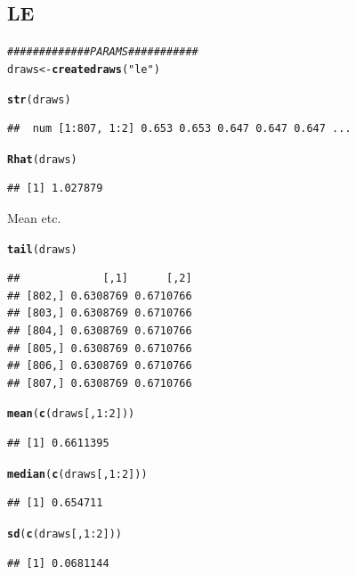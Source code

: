 \documentclass{article}\usepackage[]{graphicx}\usepackage[]{color}
\makeatletter
\newcommand{\hlnum}[1]{\textcolor[rgb]{0.686,0.059,0.569}{#1}}%
\newcommand{\hlstr}[1]{\textcolor[rgb]{0.192,0.494,0.8}{#1}}%
\newcommand{\hlcom}[1]{\textcolor[rgb]{0.678,0.584,0.686}{\textit{#1}}}%
\newcommand{\hlopt}[1]{\textcolor[rgb]{0,0,0}{#1}}%
\newcommand{\hlstd}[1]{\textcolor[rgb]{0.345,0.345,0.345}{#1}}%
\newcommand{\hlkwb}[1]{\textcolor[rgb]{0.69,0.353,0.396}{#1}}%
\newcommand{\hlkwd}[1]{\textcolor[rgb]{0.737,0.353,0.396}{\textbf{#1}}}%
\newenvironment{kframe}{%
 \def\at@end@of@kframe{}%
 \ifinner\ifhmode%
  \def\at@end@of@kframe{\end{minipage}}%
  \begin{minipage}{\columnwidth}%
 \fi\fi%
 \def\FrameCommand##1{\hskip\@totalleftmargin \hskip-\fboxsep
 \colorbox{shadecolor}{##1}\hskip-\fboxsep
     \hskip-\linewidth \hskip-\@totalleftmargin \hskip\columnwidth}%
 \MakeFramed {\advance\hsize-\width
   \@totalleftmargin\z@ \linewidth\hsize
   \@setminipage}}%
 {\par\unskip\endMakeFramed%
 \at@end@of@kframe}
\newenvironment{knitrout}{}{} %
\makeatother
\begin{document}
\subsection{LE}

\begin{knitrout}
\color{fgcolor}\begin{kframe}
\begin{alltt}
\hlcom{############# PARAMS###########}
\hlstd{draws} \hlkwb{<-} \hlkwd{createdraws}\hlstd{(}\hlstr{"le"}\hlstd{)}

\hlkwd{str}\hlstd{(draws)}
\end{alltt}
\begin{verbatim}
##  num [1:807, 1:2] 0.653 0.653 0.647 0.647 0.647 ...
\end{verbatim}
\begin{alltt}
\hlkwd{Rhat}\hlstd{(draws)}
\end{alltt}
\begin{verbatim}
## [1] 1.027879
\end{verbatim}
\end{kframe}
\end{knitrout}

Mean etc.

\begin{knitrout}
\color{fgcolor}\begin{kframe}
\begin{alltt}
\hlkwd{tail}\hlstd{(draws)}
\end{alltt}
\begin{verbatim}
##             [,1]      [,2]
## [802,] 0.6308769 0.6710766
## [803,] 0.6308769 0.6710766
## [804,] 0.6308769 0.6710766
## [805,] 0.6308769 0.6710766
## [806,] 0.6308769 0.6710766
## [807,] 0.6308769 0.6710766
\end{verbatim}
\begin{alltt}
\hlkwd{mean}\hlstd{(}\hlkwd{c}\hlstd{(draws[,} \hlnum{1}\hlopt{:}\hlnum{2}\hlstd{]))}
\end{alltt}
\begin{verbatim}
## [1] 0.6611395
\end{verbatim}
\begin{alltt}
\hlkwd{median}\hlstd{(}\hlkwd{c}\hlstd{(draws[,} \hlnum{1}\hlopt{:}\hlnum{2}\hlstd{]))}
\end{alltt}
\begin{verbatim}
## [1] 0.654711
\end{verbatim}
\begin{alltt}
\hlkwd{sd}\hlstd{(}\hlkwd{c}\hlstd{(draws[,} \hlnum{1}\hlopt{:}\hlnum{2}\hlstd{]))}
\end{alltt}
\begin{verbatim}
## [1] 0.0681144
\end{verbatim}
\end{kframe}
\end{knitrout}
\end{document}
